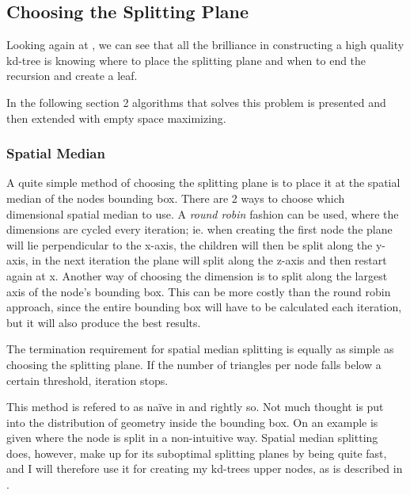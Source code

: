 \subsection{Choosing the Splitting Plane}\label{sec:splittingPlane}


Looking again at , we can see that all the
brilliance in constructing a high quality kd-tree is knowing where to
place the splitting plane and when to end the recursion and create a
leaf.


In the following section 2 algorithms that solves this problem is
presented and then extended with empty space maximizing.


\subsubsection{Spatial Median}



A quite simple method of choosing the splitting plane is to place it
at the spatial median of the nodes bounding box. There are 2 ways to
choose which dimensional spatial median to use. A \textit{round robin}
fashion can be used, where the dimensions are cycled every iteration;
ie. when creating the first node the plane will lie perpendicular to
the x-axis, the children will then be split along the y-axis, in the
next iteration the plane will split along the z-axis and then restart
again at x. Another way of choosing the dimension is to split along
the largest axis of the node's bounding box. This can be more costly
than the round robin approach, since the entire bounding box will have
to be calculated each iteration, but it will also produce the best
results.

The termination requirement for spatial median splitting is equally as
simple as choosing the splitting plane. If the number of triangles per
node falls below a certain threshold, iteration stops.


This method is refered to as naïve in  and
rightly so. Not much thought is put into the distribution of geometry
inside the bounding box. On  an example is
given where the node is split in a non-intuitive way. Spatial median
splitting does, however, make up for its suboptimal splitting planes
by being quite fast, and I will therefore use it for creating my
kd-trees upper nodes, as is described in .

